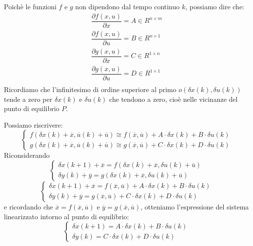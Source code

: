 \documentclass[a4paper]{report}
\begin{document}
Poich\`e le funzioni $f$ e $g$ non dipendono dal tempo continuo $k$,
possiamo dire che:
\[
\begin{array}{l}
  \dfrac{\partial f(x,u)}{\partial x} = A \in R^{n \times m}\\
  \dfrac{\partial f(x,u)}{\partial u} = B \in R^{n \times 1}\\
  \dfrac{\partial g(x,u)}{\partial x} = C \in R^{1 \times n}\\
  \dfrac{\partial g(x,u)}{\partial u} = D \in R^{1 \times 1}\\
\end{array}
\]
Ricordiamo che l'infinitesimo di ordine superiore al primo $o(\delta
x(k), \delta u(k))$ tende a zero per $\delta x(k)$ e $\delta 
u(k)$ che tendono a zero, cio\`e nelle vicinanze del punto di
equilibrio $P$.

Possiamo riscrivere:
\[
\left\{
\begin{array}{l}
  f (\delta x (k) + \overline{x}, \overline{u}(k) + \overline{u})
  \cong f(\overline{x}, \overline{u}) + A \cdot \delta x(k) + B\cdot
  \delta u(k)\\
 
  g (\delta x (k) + \overline{x}, \overline{u}(k) + \overline{u})
  \cong g(\overline{x}, \overline{u}) + C \cdot \delta x(k) + D\cdot
  \delta u(k)
\end{array}
\right.
\]
Riconsiderando
\begin{equation*}
  \left\{
  \begin{array}{l}
    \delta x(k + 1) + \overline{x} = f ( \delta x(k) + \overline{x},
    \delta u (k) + \overline{u})\\
    \delta y (k) + \overline{y} = g (\delta x (k) + \overline{x},
    \delta u(k) + \overline{u})
  \end{array}
  \right.
\end{equation*}
\begin{equation}
  \left\{
  \begin{array}{l}
    \delta x(k + 1) + \overline{x} = f(\overline{x}, \overline{u}) + A
    \cdot \delta x(k) + B\cdot \delta u(k) \\
    \delta y (k) + \overline{y} =  g(\overline{x},
    \overline{u}) + C \cdot \delta x(k) + D\cdot \delta u(k)
  \end{array}
  \right.
\end{equation}
e ricordando che $\overline{x} = f(\overline{x}, \overline{u})$ e
$\overline{y} = g(\overline{x}, \overline{u})$, otteniamo
l'espressione del sistema linearizzato intorno al punto di equilibrio:
\begin{equation}
  \left\{
  \begin{array}{l}
    \delta x(k + 1)= A \cdot \delta x(k) + B\cdot \delta u(k) \\
    \delta y (k) = C \cdot \delta x(k) + D\cdot \delta u(k)
  \end{array}
  \right.
\end{equation}
\end{document}
